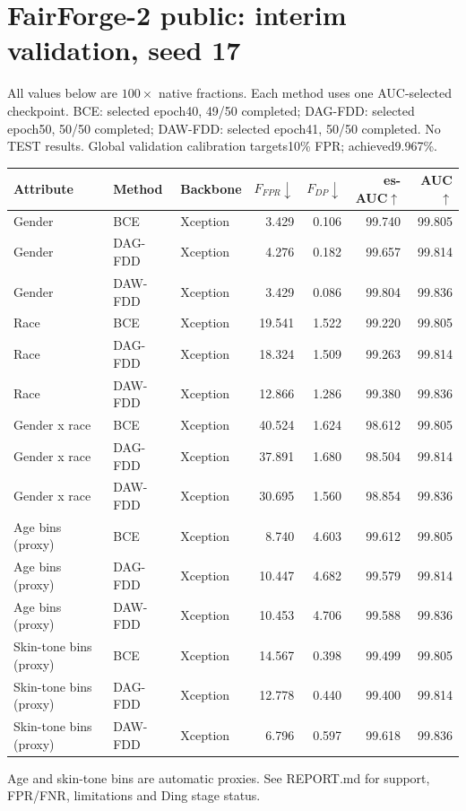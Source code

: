 \documentclass{article}
\begin{document}
\section*{FairForge-2 public: interim validation, seed 17}
All values below are $100\times$ native fractions. Each method uses one AUC-selected checkpoint.
BCE: selected epoch40, 49/50 completed; DAG-FDD: selected epoch50, 50/50 completed; DAW-FDD: selected epoch41, 50/50 completed.
No TEST results. Global validation calibration targets10\% FPR; achieved9.967\%.
\begin{center}\begin{tabular}{lllrrrr}\toprule
Attribute & Method & Backbone & $F_{FPR}\downarrow$ & $F_{DP}\downarrow$ & es-AUC$\uparrow$ & AUC$\uparrow$ \\ \midrule
Gender & BCE & Xception & 3.429 & 0.106 & 99.740 & 99.805 \\
Gender & DAG-FDD & Xception & 4.276 & 0.182 & 99.657 & 99.814 \\
Gender & DAW-FDD & Xception & 3.429 & 0.086 & 99.804 & 99.836 \\
\midrule
Race & BCE & Xception & 19.541 & 1.522 & 99.220 & 99.805 \\
Race & DAG-FDD & Xception & 18.324 & 1.509 & 99.263 & 99.814 \\
Race & DAW-FDD & Xception & 12.866 & 1.286 & 99.380 & 99.836 \\
\midrule
Gender x race & BCE & Xception & 40.524 & 1.624 & 98.612 & 99.805 \\
Gender x race & DAG-FDD & Xception & 37.891 & 1.680 & 98.504 & 99.814 \\
Gender x race & DAW-FDD & Xception & 30.695 & 1.560 & 98.854 & 99.836 \\
\midrule
Age bins (proxy) & BCE & Xception & 8.740 & 4.603 & 99.612 & 99.805 \\
Age bins (proxy) & DAG-FDD & Xception & 10.447 & 4.682 & 99.579 & 99.814 \\
Age bins (proxy) & DAW-FDD & Xception & 10.453 & 4.706 & 99.588 & 99.836 \\
\midrule
Skin-tone bins (proxy) & BCE & Xception & 14.567 & 0.398 & 99.499 & 99.805 \\
Skin-tone bins (proxy) & DAG-FDD & Xception & 12.778 & 0.440 & 99.400 & 99.814 \\
Skin-tone bins (proxy) & DAW-FDD & Xception & 6.796 & 0.597 & 99.618 & 99.836 \\
\bottomrule\end{tabular}\end{center}
Age and skin-tone bins are automatic proxies. See REPORT.md for support, FPR/FNR, limitations and Ding stage status.
\end{document}
